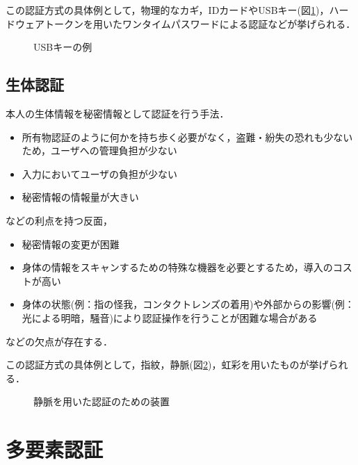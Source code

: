 この認証方式の具体例として，物理的なカギ，IDカードやUSBキー(図\ref{fig:dongle})，ハードウェアトークンを用いたワンタイムパスワードによる認証などが挙げられる．

\begin{figure}[th]
\begin{center}
\end{center}
\caption{USBキーの例}
\label{fig:dongle}
\end{figure}


\subsection{生体認証}\label{subsec:inherence}
本人の生体情報を秘密情報として認証を行う手法．

\begin{itemize}
\item 所有物認証のように何かを持ち歩く必要がなく，盗難・紛失の恐れも少ないため，ユーザへの管理負担が少ない
\item 入力においてユーザの負担が少ない
\item 秘密情報の情報量が大きい
\end{itemize}
などの利点を持つ反面，
\begin{itemize}
\item 秘密情報の変更が困難
\item 身体の情報をスキャンするための特殊な機器を必要とするため，導入のコストが高い
\item 身体の状態(例：指の怪我，コンタクトレンズの着用)や外部からの影響(例：光による明暗，騒音)により認証操作を行うことが困難な場合がある
\end{itemize}
などの欠点が存在する．

この認証方式の具体例として，指紋，静脈(図\ref{fig:veinAuth})，虹彩を用いたものが挙げられる．

\begin{figure}[th]
\begin{center}
\end{center}
\caption{静脈を用いた認証のための装置}
\label{fig:veinAuth}
\end{figure}

\section{多要素認証}\label{sec:2factor}


